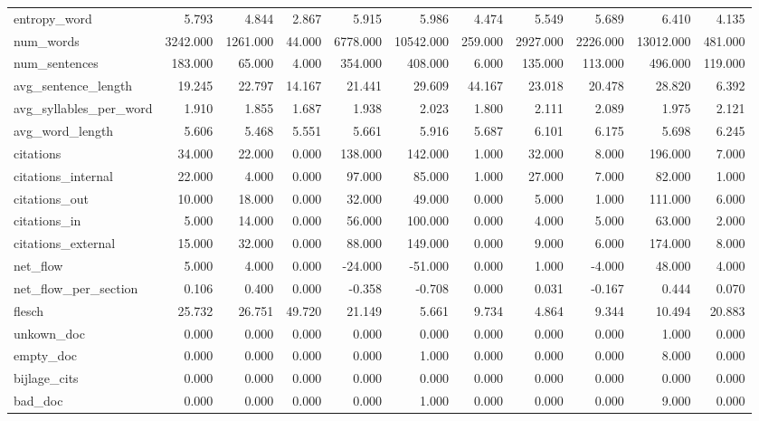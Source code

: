 \begin{tabular}{lrrrrrrrrrr}
\cline{1-11}
entropy\_word & 5.793 & 4.844 & 2.867 & 5.915 & 5.986 & 4.474 & 5.549 & 5.689 & 6.410 & 4.135 \\
\cline{1-11}
num\_words & 3242.000 & 1261.000 & 44.000 & 6778.000 & 10542.000 & 259.000 & 2927.000 & 2226.000 & 13012.000 & 481.000 \\
\cline{1-11}
num\_sentences & 183.000 & 65.000 & 4.000 & 354.000 & 408.000 & 6.000 & 135.000 & 113.000 & 496.000 & 119.000 \\
\cline{1-11}
avg\_sentence\_length & 19.245 & 22.797 & 14.167 & 21.441 & 29.609 & 44.167 & 23.018 & 20.478 & 28.820 & 6.392 \\
\cline{1-11}
avg\_syllables\_per\_word & 1.910 & 1.855 & 1.687 & 1.938 & 2.023 & 1.800 & 2.111 & 2.089 & 1.975 & 2.121 \\
\cline{1-11}
avg\_word\_length & 5.606 & 5.468 & 5.551 & 5.661 & 5.916 & 5.687 & 6.101 & 6.175 & 5.698 & 6.245 \\
\cline{1-11}
citations & 34.000 & 22.000 & 0.000 & 138.000 & 142.000 & 1.000 & 32.000 & 8.000 & 196.000 & 7.000 \\
\cline{1-11}
citations\_internal & 22.000 & 4.000 & 0.000 & 97.000 & 85.000 & 1.000 & 27.000 & 7.000 & 82.000 & 1.000 \\
\cline{1-11}
citations\_out & 10.000 & 18.000 & 0.000 & 32.000 & 49.000 & 0.000 & 5.000 & 1.000 & 111.000 & 6.000 \\
\cline{1-11}
citations\_in & 5.000 & 14.000 & 0.000 & 56.000 & 100.000 & 0.000 & 4.000 & 5.000 & 63.000 & 2.000 \\
\cline{1-11}
citations\_external & 15.000 & 32.000 & 0.000 & 88.000 & 149.000 & 0.000 & 9.000 & 6.000 & 174.000 & 8.000 \\
\cline{1-11}
net\_flow & 5.000 & 4.000 & 0.000 & -24.000 & -51.000 & 0.000 & 1.000 & -4.000 & 48.000 & 4.000 \\
\cline{1-11}
net\_flow\_per\_section & 0.106 & 0.400 & 0.000 & -0.358 & -0.708 & 0.000 & 0.031 & -0.167 & 0.444 & 0.070 \\
\cline{1-11}
flesch & 25.732 & 26.751 & 49.720 & 21.149 & 5.661 & 9.734 & 4.864 & 9.344 & 10.494 & 20.883 \\
\cline{1-11}
unkown\_doc & 0.000 & 0.000 & 0.000 & 0.000 & 0.000 & 0.000 & 0.000 & 0.000 & 1.000 & 0.000 \\
\cline{1-11}
empty\_doc & 0.000 & 0.000 & 0.000 & 0.000 & 1.000 & 0.000 & 0.000 & 0.000 & 8.000 & 0.000 \\
\cline{1-11}
bijlage\_cits & 0.000 & 0.000 & 0.000 & 0.000 & 0.000 & 0.000 & 0.000 & 0.000 & 0.000 & 0.000 \\
\cline{1-11}
bad\_doc & 0.000 & 0.000 & 0.000 & 0.000 & 1.000 & 0.000 & 0.000 & 0.000 & 9.000 & 0.000 \\
\cline{1-11}
\bottomrule
\end{tabular}

